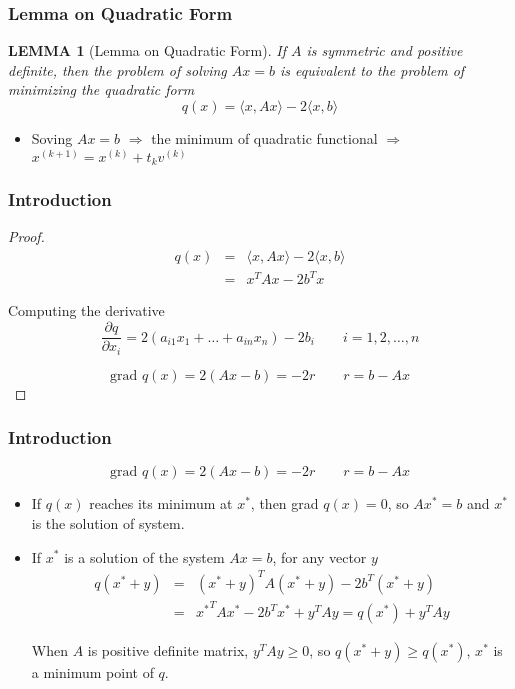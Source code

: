 \documentclass[notheorems,mathserif,table,compress]{beamer}  %
\begin{document}
%
\begin{frame}
\frametitle{Lemma on Quadratic Form}
\newtheorem{lemma}{LEMMA}
\begin{lemma}[Lemma on Quadratic Form]
If $A$ is symmetric and positive definite, then the problem of solving $Ax=b$ is equivalent to the problem of minimizing the quadratic form
\begin{displaymath}
q(x)=\langle x,Ax \rangle-2\langle x,b \rangle
\end{displaymath}

\end{lemma}

\begin{itemize}
\item Soving $Ax=b$ $\Longrightarrow$ the minimum of quadratic functional $\Longrightarrow$ $x^{(k+1)}=x^{(k)}+t_kv^{(k)}$
\end{itemize}

\end{frame}

%
\begin{frame}
\frametitle{Introduction}
\begin{proof}
\begin{eqnarray*}
q(x)&=&\langle x,Ax \rangle-2\langle x,b \rangle\\
    &=&x^TAx-2b^Tx
\end{eqnarray*}

Computing the derivative
\begin{displaymath}
\frac{\partial q}{\partial x_i}=2(a_{i1}x_1+\ldots+a_{in}x_n)-2b_i \qquad i=1,2,\ldots,n
\end{displaymath}

\begin{displaymath}
\textrm{grad } q(x)=2(Ax-b)=-2r \qquad r=b-Ax
\end{displaymath}

\end{proof}
\end{frame}


%
\begin{frame}
\frametitle{Introduction}
\begin{displaymath}
\textrm{grad } q(x)=2(Ax-b)=-2r \qquad r=b-Ax
\end{displaymath}

\begin{itemize}
\item If $q(x)$ reaches its minimum at $x^*$, then grad $q(x)=0$, so $Ax^*=b$ and $x^*$ is the solution of system.
\item If $x^*$ is a solution of the system $Ax=b$, for any vector $y$
\begin{eqnarray*}
q(x^*+y)&=&(x^*+y)^TA(x^*+y)-2b^T(x^*+y)\\
&=&{x^*}^TAx^*-2b^Tx^*+y^TAy=q(x^*)+y^TAy
\end{eqnarray*}

When $A$ is positive definite matrix, $y^TAy\geq0$, so $q(x^*+y)\geq q(x^*)$, $x^*$ is a minimum point of $q$.  
\end{itemize}
\end{frame}
\end{document}
